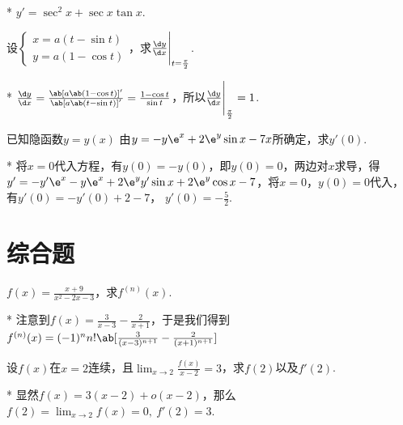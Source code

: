 \begin{draft}
        \vspace{3em}
\end{draft}
\begin{solution}*
        $y'=\sec ^2x+\sec x\tan x$.
\end{solution}
\begin{problem}
	设$\begin{cases}
		x=a(t-\sin t)\\
		y=a(1-\cos t)
	\end{cases}$，求$\frac{\d y}{\d x}\Bigg|_{t=\frac{\pi}{2}}$.
\end{problem}
\begin{draft}
        \vspace{3em}
\end{draft}
\begin{solution}*
        $\frac{\d y}{\d x}=\frac{\ab[a\ab(1-\cos t)]'}{\ab[a\ab(t-\sin t)]'}=\frac{1-\cos t}{\sin t}$，所以$\frac{\d y}{\d x}\Bigg|_{\frac{\pi}{2}}=1$.
\end{solution}
\begin{problem}
	已知隐函数$y=y(x)$ 由$y=-y\e^x+2\e^y\sin x-7x$所确定，求$y'(0)$.
\end{problem}
\begin{draft}
        \vspace{3em}
\end{draft}
\begin{solution}*
        将$x=0$代入方程，有$y(0)=-y(0)$，即$y(0)=0$，两边对$x$求导，得$y'=-y' \e^x-y \e^x+2 \e^y y' \sin x+2 \e^y \cos x-7$，将$x=0$，$y(0)=0$代入，有$y'(0)=-y'(0)+2-7$， $y'(0)=-\frac{5}{2}$.
\end{solution}

\section{综合题}
\begin{problem}
        $f(x)=\frac{x+9}{x^2-2x-3}$，求$f^{(n)}(x)$.
\end{problem}
\begin{draft}
        \vspace{3em}
\end{draft}
\begin{solution}*
        注意到$f(x)=\frac{3}{x-3}-\frac{2}{x+1}$，于是我们得到$f^{(n)}(x)=(-1)^nn!\ab[\frac{3}{(x-3)^{n+1}}-\frac{2}{(x+1)^{n+1}}]$
\end{solution}

\begin{problem}
        设$f(x)$在$x=2$连续，且$\lim_{x\to 2}\frac{f(x)}{x-2}=3$，求$f(2)$以及$f'(2)$.
\end{problem}
\begin{draft}
        \vspace{3em}
\end{draft}
\begin{solution}*
        显然$f(x)=3(x-2)+o(x-2)$，那么$f(2)=\lim_{x\to 2}f(x)=0,\ f'(2)=3$.
\end{solution}

